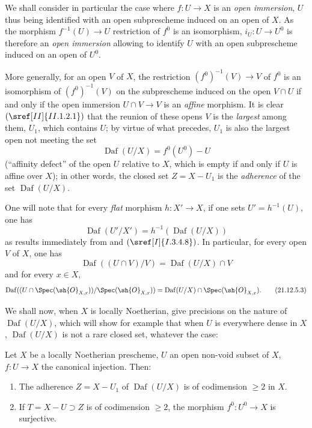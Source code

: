 \begin{env}[21.12.5]
\label{IV.21.12.5}
We shall consider in particular the case where $f:U\to X$ is an \emph{open immersion}, $U$ thus being identified with an open subprescheme induced on an open of $X$.
As the morphism $f^{-1}(U)\to U$ restriction of $f^0$ is an isomorphism, $i_U:U\to U^0$ is therefore an \emph{open immersion} allowing to identify $U$ with an open subprescheme induced on an open of $U^0$.

More generally, for an open $V$ of $X$, the restriction $(f^0)^{-1}(V)\to V$ of $f^0$ is an isomorphism of $(f^0)^{-1}(V)$ on the subprescheme induced on the open $V\cap U$ if and only if the open immersion $U\cap V\to V$ is an \emph{affine} morphism.
It is clear $(\sref[II]{II.1.2.1})$ that the reunion of these opens $V$ is the \emph{largest} among them, $U_1$, which contains $U$; by virtue of what precedes, $U_1$ is also the largest open not meeting the set
\[
  \operatorname{Daf}(U/X)=f^0(U^0)-U
\]
(``affinity defect'' of the open $U$ relative to $X$, which is empty if and only if $U$ is affine over $X$);
in other words, the closed set $Z=X-U_1$ is the \emph{adherence} of the set $\operatorname{Daf}(U/X)$.

One will note that for every \emph{flat} morphism $h:X'\to X$, if one sets $U'=h^{-1}(U)$, one has
\[
\label{IV.21.12.5.1}
  \operatorname{Daf}(U'/X')=h^{-1}(\operatorname{Daf}(U/X))
  \tag{21.12.5.1}
\]
as results immediately from  and $(\sref[I]{I.3.4.8})$.
In particular, for every open $V$ of $X$, one has
\[
\label{IV.21.12.5.2}
  \operatorname{Daf}((U\cap V)/V)=\operatorname{Daf}(U/X)\cap V
  \tag{21.12.5.2}
\]
and for every $x\in X$,
\[
\label{IV.21.12.5.3}
  \operatorname{Daf}((U\cap\Spec(\sh{O}_{X,x}))/\Spec(\sh{O}_{X,x}))=\operatorname{Daf}(U/X)\cap\Spec(\sh{O}_{X,x}).
  \tag{21.12.5.3}
\]
\end{env}

We shall now, when $X$ is locally Noetherian, give precisions on the nature of $\operatorname{Daf}(U/X)$, which will show for example that when $U$ is everywhere dense in $X$, $\operatorname{Daf}(U/X)$ is not a rare closed set, whatever the case:


\begin{theorem}[21.12.6]
\label{IV.21.12.6}
Let $X$ be a locally Noetherian prescheme, $U$ an open non-void subset of $X$, $f:U\to X$ the canonical injection.
Then:
\begin{enumerate}[label=\emph{(\roman*)}]
  \item The adherence $Z=X-U_1$ of $\operatorname{Daf}(U/X)$ is of codimension $\geq 2$ in $X$.
  \item If $T=X-U\supset Z$ is of codimension $\geq 2$, the morphism $f^0:U^0\to X$ is surjective.
\end{enumerate}
\end{theorem}

